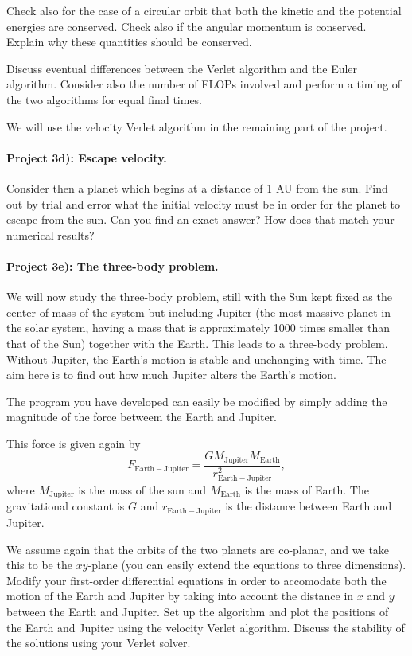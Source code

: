 \documentclass[%
oneside,                 %
final,                   %
10pt]{article}
\begin{document}
Check also for the case of a circular orbit that both the kinetic and the potential energies are conserved.
Check also if the  angular momentum is conserved. Explain why these quantities
should be conserved.

Discuss eventual differences between the Verlet algorithm and the Euler algorithm. Consider also the number of FLOPs involved and perform a timing of the
two algorithms for equal final times.

We will use the velocity Verlet algorithm in the remaining part of the project. 



\paragraph{Project 3d): Escape velocity.}
Consider then a planet which begins at a distance of 1 AU from the sun. Find out by trial and error
what the initial velocity must be in order for the planet to escape from the sun.  Can you find an exact answer?  How does that match your numerical results?

\paragraph{Project 3e): The three-body problem.}
We will now study the three-body problem, still with the Sun kept fixed as the center of mass of the system  but 
including Jupiter (the most massive planet in the solar system, having a mass that is approximately 1000 times
smaller than that of the Sun) together with the Earth. This leads to a three-body problem. Without Jupiter, the Earth's motion is stable and unchanging with time. The aim here is to find out how much Jupiter alters the Earth's motion.

The program you have developed can easily be modified by simply adding the magnitude of the force betweem the Earth and Jupiter.

This force is given again by 
\[
F_{\mathrm{Earth-Jupiter}}=\frac{GM_{\mathrm{Jupiter}}M_{\mathrm{Earth}}}{r_{\mathrm{Earth-Jupiter}}^2},
\]
where $M_{\mathrm{Jupiter}}$ is the mass of the sun and $M_{\mathrm{Earth}}$ is the mass of Earth. 
The gravitational constant is $G$ and $r_{\mathrm{Earth-Jupiter}}$ is the distance between Earth and Jupiter.

We assume again that the orbits of the two planets are co-planar, and we take this to be the $xy$-plane (you can easily extend the equations to three dimensions). 
Modify your first-order differential equations in order to accomodate both the
motion of the Earth and Jupiter by taking into account the distance in $x$ and
$y$ between the Earth and Jupiter. Set up the algorithm and plot the positions of the Earth and Jupiter using the velocity Verlet algorithm.
Discuss the stability of the solutions using your Verlet solver.
\end{document}
